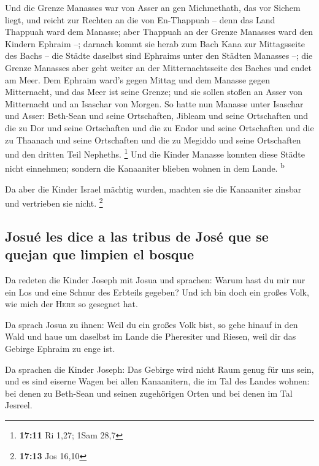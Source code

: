  Und die Grenze Manasses war von Asser an gen Michmethath,
das vor Sichem liegt, und reicht zur Rechten an die von En-Thappuah --
 denn das Land Thappuah ward dem Manasse; aber Thappuah an
der Grenze Manasses ward den Kindern Ephraim --;  darnach
kommt sie herab zum Bach Kana zur Mittagsseite des Bachs -- die Städte
daselbst sind Ephraims unter den Städten Manasses --; die Grenze
Manasses aber geht weiter an der Mitternachtsseite des Baches und endet
am Meer.  Dem Ephraim ward's gegen Mittag und dem Manasse
gegen Mitternacht, und das Meer ist seine Grenze; und sie sollen stoßen
an Asser von Mitternacht und an Isaschar von Morgen.  So
hatte nun Manasse unter Isaschar und Asser: Beth-Sean und seine
Ortschaften, Jibleam und seine Ortschaften und die zu Dor und seine
Ortschaften und die zu Endor und seine Ortschaften und die zu Thaanach
und seine Ortschaften und die zu Megiddo und seine Ortschaften und den
dritten Teil Nepheths. \footnote{\textbf{17:11} Ri 1,27; 1Sam 28,7}
 Und die Kinder Manasse konnten diese Städte nicht
einnehmen; sondern die Kanaaniter blieben wohnen in dem Lande.
\textsuperscript{b}

 Da aber die Kinder Israel mächtig wurden, machten sie
die Kanaaniter zinsbar und vertrieben sie nicht. \footnote{\textbf{17:13}
  Jos 16,10}

\hypertarget{josuuxe9-les-dice-a-las-tribus-de-josuxe9-que-se-quejan-que-limpien-el-bosque}{%
\subsection{Josué les dice a las tribus de José que se quejan que
limpien el
bosque}\label{josuuxe9-les-dice-a-las-tribus-de-josuxe9-que-se-quejan-que-limpien-el-bosque}}

 Da redeten die Kinder Joseph mit Josua und sprachen:
Warum hast du mir nur ein Los und eine Schnur des Erbteils gegeben? Und
ich bin doch ein großes Volk, wie mich der \textsc{Herr} so gesegnet
hat.

 Da sprach Josua zu ihnen: Weil du ein großes Volk bist,
so gehe hinauf in den Wald und haue um daselbst im Lande die Pheresiter
und Riesen, weil dir das Gebirge Ephraim zu enge ist.

 Da sprachen die Kinder Joseph: Das Gebirge wird nicht
Raum genug für uns sein, und es sind eiserne Wagen bei allen
Kanaanitern, die im Tal des Landes wohnen: bei denen zu Beth-Sean und
seinen zugehörigen Orten und bei denen im Tal Jesreel.

